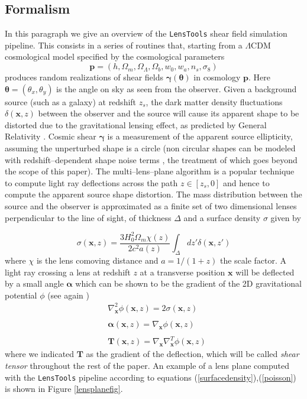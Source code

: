 \documentclass[5p]{elsarticle}
\newcommand{\bb}[1]{\mathbf{#1}}
\newcommand{\LT}{\texttt{LensTools} }
\begin{document}
\subsection{Formalism}
%
In this paragraph we give an overview of the \LT shear field simulation pipeline. This consists in a series of routines that, starting from a $\Lambda$CDM cosmological model specified by the cosmological parameters 
\begin{equation}
\bb{p}=(h,\Omega_m,\Omega_\Lambda,\Omega_b,w_0,w_a,n_s,\sigma_8)
\end{equation} 
%
produces random realizations of shear fields $\pmb{\gamma}(\pmb{\theta})$ in cosmology $\bb{p}$. Here $\pmb{\theta}=(\theta_x,\theta_y)$ is the angle on sky as seen from the observer. Given a background source (such as a galaxy) at redshift $z_s$, the dark matter density fluctuations $\delta(\bb{x},z)$ between the observer and the source will cause its apparent shape to be distorted due to the gravitational lensing effect, as predicted by General Relativity \citep{wlreview}. Cosmic shear $\pmb{\gamma}$ is a measurement of the apparent source ellipticity, assuming the unperturbed shape is a circle (non circular shapes can be modeled with redshift--dependent shape noise terms \citep{wlreview}, the treatment of which goes beyond the scope of this paper). The multi--lens--plane algorithm \citep{RayTracingHartlap,Ray1,Ray2,Ray3} is a popular technique to compute light ray deflections across the path $z\in[z_s,0]$ and hence to compute the apparent source shape distortion. The mass distribution between the source and the observer is approximated as a finite set of two dimensional lenses perpendicular to the line of sight, of thickness $\Delta$ and a surface density $\sigma$ given by 

\begin{equation}
\label{surfacedensity}
\sigma(\bb{x},z) = \frac{3H_0^2\Omega_m\chi(z)}{2c^2a(z)}\int_\Delta dz'\delta(\bb{x},z')
\end{equation}
%
where $\chi$ is the lens comoving distance and $a=1/(1+z)$ the scale factor. A light ray crossing a lens at redshift $z$ at a transverse position $\bb{x}$ will be deflected by a small angle $\pmb{\alpha}$ which can be shown to be the gradient of the 2D gravitational potential $\phi$ (see again \citep{RayTracingHartlap}) 
%
\begin{equation}
\label{poisson}
\begin{matrix}
& \nabla^2_\bb{x} \phi(\bb{x},z) = 2\sigma(\bb{x},z) \\ \\
& \pmb{\alpha}(\bb{x},z) = \nabla_\bb{x} \phi(\bb{x},z) \\ \\
& \bb{T}(\bb{x},z) = \nabla_\bb{x}\nabla_\bb{x}^T \phi(\bb{x},z)
\end{matrix}
\end{equation}
%
where we indicated $\bb{T}$ as the gradient of the deflection, which will be called \textit{shear tensor} throughout the rest of the paper. An example of a lens plane computed with the \LT pipeline according to equations (\ref{surfacedensity}),(\ref{poisson}) is shown in Figure \ref{lensplanefig}. 
\end{document}

